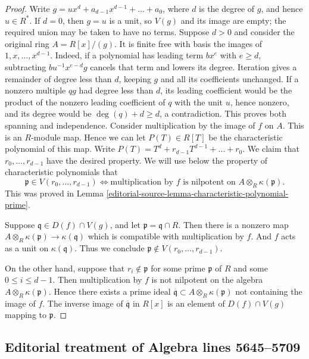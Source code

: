 \begin{proof}
Write $g = ux^d + a_{d-1}x^{d-1} + \ldots + a_0$, where
$d$ is the degree of $g$, and hence $u \in R^*$.
If $d=0$, then $g=u$ is a unit, so $V(g)$ and its image are empty;
the required union may be taken to have no terms. Suppose $d>0$ and
consider the original ring $A=R[x]/(g)$. It is finite free with basis
the images of $1,x,\ldots,x^{d-1}$. Indeed, if a polynomial has leading
term $bx^e$ with $e\geq d$, subtracting
$bu^{-1}x^{e-d}g$ cancels that term and lowers its degree. Iteration
gives a remainder of degree less than $d$, keeping $g$ and all its
coefficients unchanged. If a nonzero multiple $qg$ had degree less
than $d$, its leading coefficient would be the product of the nonzero
leading coefficient of $q$ with the unit $u$, hence nonzero, and its
degree would be $\deg(q)+d\geq d$, a contradiction. This proves both
spanning and independence. Consider multiplication by the image of
$f$ on $A$. This is an $R$-module map.
Hence we can let $P(T) \in R[T]$ be the characteristic polynomial
of this map. Write $P(T) = T^d + r_{d-1} T^{d-1} + \ldots + r_0$.
We claim that $r_0, \ldots, r_{d-1}$ have the desired property.
We will use below the property of characteristic polynomials
that
$$
\mathfrak p \in V(r_0, \ldots, r_{d-1})
\Leftrightarrow
\text{multiplication by }f\text{ is nilpotent on }
A \otimes_R \kappa(\mathfrak p).
$$
This was proved in Lemma \ref{editorial-source-lemma-characteristic-polynomial-prime}.

\medskip\noindent
Suppose $\mathfrak q\in D(f) \cap V(g)$, and let
$\mathfrak p = \mathfrak q \cap R$. Then there is a nonzero map
$A \otimes_R \kappa(\mathfrak p) \to \kappa(\mathfrak q)$ which
is compatible with multiplication by $f$.
And $f$ acts as a unit on $\kappa(\mathfrak q)$.
Thus we conclude $\mathfrak p \not \in  V(r_0, \ldots, r_{d-1})$.

\medskip\noindent
On the other hand, suppose that $r_i \not\in \mathfrak p$ for some
prime $\mathfrak p$ of $R$ and some $0 \leq i \leq d - 1$.
Then multiplication by $f$ is not nilpotent on the algebra
$A \otimes_R \kappa(\mathfrak p)$.
Hence there exists a prime ideal $\overline{\mathfrak q} \subset
A \otimes_R \kappa(\mathfrak p)$ not containing the image of $f$.
The inverse image of $\overline{\mathfrak q}$ in $R[x]$
is an element of $D(f) \cap V(g)$ mapping to $\mathfrak p$.
\end{proof}


\subsection{Editorial treatment of Algebra lines 5645--5709}

